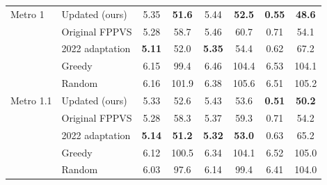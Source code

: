 \begin{tabular}{llcccccc}
\midrule
Metro 1 & Updated (ours) & 5.35 & \textbf{51.6} & 5.44 & \textbf{52.5} & \textbf{0.55} & \textbf{48.6} \\
 & Original FPPVS & 5.28 & 58.7 & 5.46 & 60.7 & 0.71 & 54.1 \\
 & 2022 adaptation & \textbf{5.11} & 52.0 & \textbf{5.35} & 54.4 & 0.62 & 67.2 \\
 & Greedy & 6.15 & 99.4 & 6.46 & 104.4 & 6.53 & 104.1 \\
 & Random & 6.16 & 101.9 & 6.38 & 105.6 & 6.51 & 105.2 \\
\midrule
Metro 1.1 & Updated (ours) & 5.33 & 52.6 & 5.43 & 53.6 & \textbf{0.51} & \textbf{50.2} \\
 & Original FPPVS & 5.28 & 58.3 & 5.37 & 59.3 & 0.71 & 54.2 \\
 & 2022 adaptation & \textbf{5.14} & \textbf{51.2} & \textbf{5.32} & \textbf{53.0} & 0.63 & 65.2 \\
 & Greedy & 6.12 & 100.5 & 6.34 & 104.1 & 6.52 & 105.0 \\
 & Random & 6.03 & 97.6 & 6.14 & 99.4 & 6.41 & 104.0 \\
\bottomrule
\end{tabular}